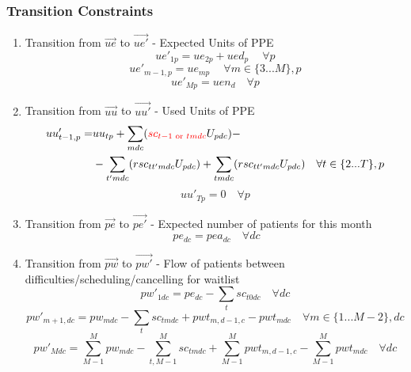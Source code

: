 \documentclass{article}
\begin{document}
\subsubsection{Transition Constraints}
\begin{enumerate}

	\item Transition from $\vec{ue}$ to $\vec{ue'}$ - Expected Units of PPE
		\begin{equation}  
			ue'_{1p} = ue_{2p} + ued_{p}\ \quad \forall p 
		\end{equation} 
		\begin{equation}  
			ue'_{m-1,p} = ue_{mp}\ \quad \forall m \in \{3...M\}, p
		 \end{equation} 
		\begin{equation}  
			ue'_{Mp} = uen_{d} \quad \forall p 
		\end{equation} 
	
	\item Transition from $\vec{uu}$ to $\vec{uu'}$ - Used Units of PPE		
		\begin{align} \begin{split}  
			uu'_{t-1,p} = &  uu	_{tp} + \sum_{mdc} ( {\color{red} sc_{t-1 \text{ or } tmdc} } U_{pdc} ) - \\ 
								&	- \sum_{t'mdc} (rsc_{tt'mdc} U_{pdc}) + \sum_{tmdc} (rsc_{tt'mdc} U_{pdc}) \quad \forall t \in \{2...T\}, p 
		\end{split} \end{align}
		\begin{equation}  
			uu'_{Tp} = 0 \quad \forall p 
		\end{equation} 

	\item Transition from $\vec{pe}$ to $\vec{pe'}$ - Expected number of patients for this month
		\begin{equation} 
			\ pe_{dc} = pea_{dc} \quad \forall dc 
		\end{equation} 

	\item Transition from $\vec{pw}$ to $\vec{pw'}$ - Flow of patients between difficulties/scheduling/cancelling for waitlist
		\begin{equation}  
			pw'_{1dc} = pe_{dc} - \sum_{t} sc_{t0dc} \quad \forall dc 
		\end{equation} 
		\begin{equation}  
			pw'_{m+1, dc} = pw_{mdc} - \sum_{t} sc_{tmdc} + pwt_{m,d-1,c} - pwt_{mdc} \quad \forall m \in \{1...M-2 \}, dc 
		\end{equation} 
		\begin{equation}  
			pw'_{Mdc} = \sum_{M-1}^M pw_{mdc} - \sum_{t,M-1}^{M} sc_{tmdc} + \sum_{M-1}^{M} pwt_{m,d-1,c} - 
			\sum_{M-1}^{M} pwt_{mdc}\quad \forall dc 
		\end{equation} 


\end{enumerate}
\end{document}
